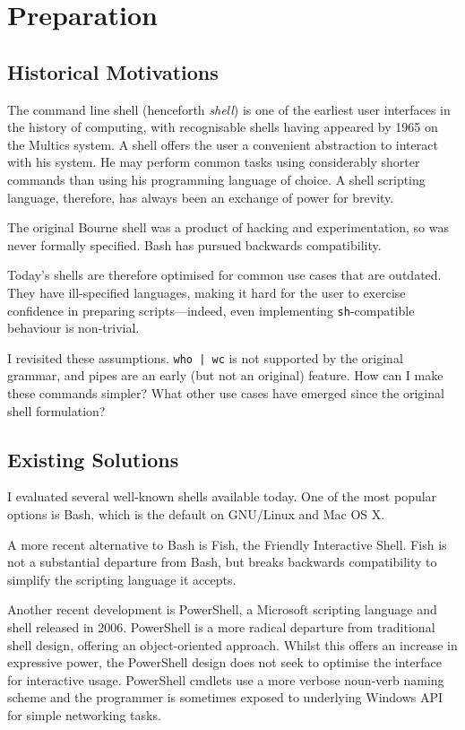 \documentclass[12pt,twoside,notitlepage]{report}
\begin{document}
\cleardoublepage

\chapter{Preparation}

\section{Historical Motivations}
The command line shell (henceforth \emph{shell}) is one of the earliest user
interfaces in the history of computing, with recognisable shells having appeared
by 1965 \cite{multics}on the Multics system. A shell offers the user a
convenient abstraction to interact with his system. He may perform common tasks
using considerably shorter commands than using his programming language of
choice. A shell scripting language, therefore, has always been an exchange of
power for brevity.

The original Bourne shell was a product of hacking and experimentation, so was
never formally specified. Bash has pursued backwards compatibility.

Today's shells are therefore optimised for common use cases that are
outdated. They have ill-specified languages, making it hard for the user to
exercise confidence in preparing scripts---indeed, even implementing
\texttt{sh}-compatible behaviour is non-trivial.

I revisited these assumptions. \texttt{who | wc} is not supported by the
original grammar, and pipes are an early (but not an original) feature. How can
I make these commands simpler? What other use cases have emerged since the
original shell formulation?

\section{Existing Solutions}
I evaluated several well-known shells available today. One of the most popular
options is Bash, which is the default on GNU/Linux and Mac OS X.

A more recent alternative to Bash is Fish, the Friendly Interactive Shell. Fish
is not a substantial departure from Bash, but breaks backwards compatibility to
simplify the scripting language it accepts.

Another recent development is PowerShell, a Microsoft scripting language and
shell released in 2006. PowerShell is a more radical departure from traditional
shell design, offering an object-oriented approach. Whilst this offers an
increase in expressive power, the PowerShell design does not seek to optimise
the interface for interactive usage. PowerShell cmdlets use a more verbose
noun-verb naming scheme and the programmer is sometimes exposed to underlying
Windows API for simple networking tasks.
\end{document}
